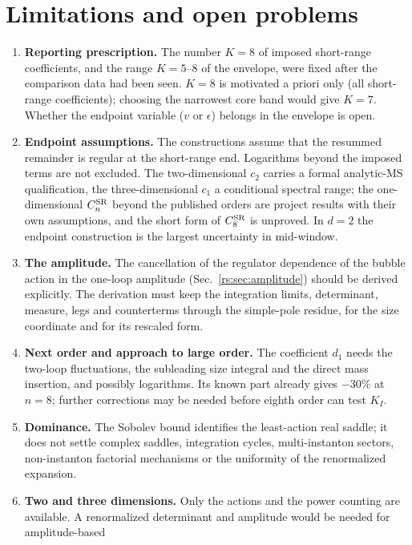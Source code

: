 \section{Limitations and open problems}\label{rs:sec:open}
\begin{enumerate}
\item \textbf{Reporting prescription.} The number $K=8$ of imposed short-range
coefficients, and the range $K=5$--$8$ of the envelope, were fixed after the comparison data
had been seen. $K=8$ is motivated a priori only (all short-range coefficients); choosing the
narrowest core band would give $K=7$. Whether the endpoint variable ($v$ or $\epsilon$) belongs in the
envelope is open.
\item \textbf{Endpoint assumptions.} The constructions assume that the resummed remainder is
regular at the short-range end. Logarithms beyond the imposed terms are not excluded. The
two-dimensional $c_2$ carries a formal analytic-MS qualification, the three-dimensional
$c_1$ a conditional spectral range; the one-dimensional $C^{\mathrm{SR}}_n$ beyond the published orders
are project results with their own assumptions, and the short form of $C^{\mathrm{SR}}_8$ is unproved.
In $d=2$ the endpoint construction is the largest uncertainty in mid-window.
\item \textbf{The amplitude.} The cancellation of the regulator dependence of the bubble
action in the one-loop amplitude (Sec.~\ref{rs:sec:amplitude}) should be derived explicitly. The
derivation must keep the integration limits, determinant, measure, legs and counterterms
through the simple-pole residue, for the size coordinate and for its rescaled form.
\item \textbf{Next order and approach to large order.} The coefficient $d_1$ needs the
two-loop fluctuations, the subleading size integral and the direct mass insertion, and
possibly logarithms. Its known part already gives $-30\%$ at $n=8$; further corrections may
be needed before eighth order can test $K_I$.
\item \textbf{Dominance.} The Sobolev bound identifies the least-action real saddle; it does
not settle complex saddles, integration cycles, multi-instanton sectors, non-instanton
factorial mechanisms or the uniformity of the renormalized expansion.
\item \textbf{Two and three dimensions.} Only the actions and the power counting are
available. A renormalized determinant and amplitude would be needed for amplitude-based

\end{enumerate}
